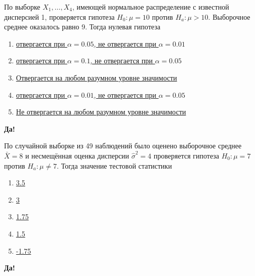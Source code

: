 \documentclass[t]{beamer}
\begin{document}
 \begin{frame} \label{33-Yes} 
\begin{block}{33} 

  По выборке $X_1,\ldots,X_{4}$, имеющей нормальное распределение с известной дисперсией 1, проверяется гипотеза $H_0: \mu = 10$ против $H_a: \mu > 10$. Выборочное среднее оказалось равно 9. Тогда нулевая гипотеза


 \end{block} 
\begin{enumerate} 
\item[] \hyperlink{33-No}{\beamergotobutton{} отвергается при $\alpha = 0.05$, не отвергается при $\alpha = 0.01$}
\item[] \hyperlink{33-No}{\beamergotobutton{} отвергается при $\alpha = 0.1$, не отвергается при $\alpha = 0.05$}
\item[] \hyperlink{33-No}{\beamergotobutton{} Отвергается на любом разумном уровне значимости}
\item[] \hyperlink{33-No}{\beamergotobutton{} отвергается при $\alpha = 0.01$, не отвергается при $\alpha = 0.05$}
\item[] \hyperlink{33-Yes}{\beamergotobutton{} Не отвергается на любом разумном уровне значимости}
\end{enumerate} 

 \textbf{Да!} 
 \hyperlink{34}{}\end{frame} 


 \begin{frame} \label{34-Yes} 
\begin{block}{34} 

  По случайной выборке из 49 наблюдений было оценено выборочное среднее $\bar{X} = 8$  и несмещённая оценка дисперсии $\hat{\sigma}^2 = 4$ проверяется гипотеза $H_0: \mu = 7$ против $H_a: \mu \ne 7$. Тогда значение тестовой статистики


 \end{block} 
\begin{enumerate} 
\item[] \hyperlink{34-Yes}{\beamergotobutton{} 3.5}
\item[] \hyperlink{34-No}{\beamergotobutton{} 3}
\item[] \hyperlink{34-No}{\beamergotobutton{} 1.75}
\item[] \hyperlink{34-No}{\beamergotobutton{} 1.5}
\item[] \hyperlink{34-No}{\beamergotobutton{} -1.75}
\end{enumerate} 

 \textbf{Да!} 
 \hyperlink{35}{}\end{frame} 
\end{document}

